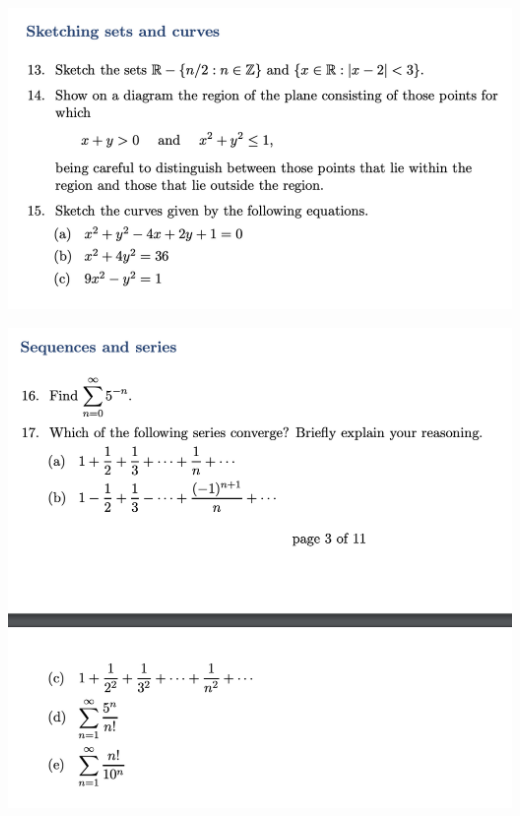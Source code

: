 \includegraphics[width=400pt]{img/ou-entry-cdc6.png}


\includegraphics[width=400pt]{img/ou-entry-ce7c.png}
